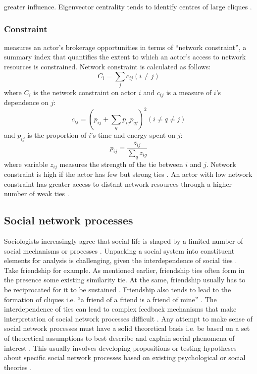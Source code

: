 greater influence. Eigenvector centrality tends to identify centres of large cliques \citep{borgatti2013analyzing}. \medskip

\subsubsection{Constraint}

\citet{burt1992structural} measures an actor's brokerage opportunities in terms of \enquote{network constraint}, a summary index that quantifies the extent to which an actor's access to network resources is constrained. Network constraint is calculated as follows: $$ C_i = \sum_j c_{ij} (i \neq j) $$ where $C_i$ is the network constraint on actor $i$ and $c_{ij}$ is a measure of $i$'s dependence on $j$: $$ c_{ij} = (p_{ij} + \sum_qp_{iq}p_{qj})^2 (i \neq q \ne j) $$ and $p_{ij}$ is the proportion of $i$'s time and energy spent on $j$: $$ p_{ij} = \frac{z_{ij}}{\sum_qz_{ig}} $$ where variable $z_{ij}$ measures the strength of the tie between $i$ and $j$. Network constraint is high if the actor has few but strong ties \citep{burt2010neighbor}. An actor with low network constraint has greater access to distant network resources through a higher number of weak ties \citep{granovetter1973strength}. \medskip

\subsection{Social network processes}

Sociologists increasingly agree that social life is shaped by a limited number of social mechanisms or processes \citep{crossley2015cases}. Unpacking a social system into constituent elements for analysis is challenging, given the interdependence of social ties \citep{robins2015doing}. Take friendship for example. As mentioned earlier, friendship ties often form in the presence some existing similarity tie. At the same, friendship usually has to be reciprocated for it to be sustained \citep{hartup1996company,almaatouq2016role}. Friendship also tends to lead to the formation of cliques i.e. \enquote{a friend of a friend is a friend of mine} \citep{lusher2013exponential}. The interdependence of ties can lead to complex feedback mechanisms that make interpretation of social network processes difficult \citep{robins2015doing}. Any attempt to make sense of social network processes must have a solid theoretical basis i.e. be based on a set of theoretical assumptions to best describe and explain social phenomena of interest \citep{borgatti2013analyzing}. This usually involves developing propositions or testing hypotheses about specific social network processes based on existing psychological or social theories \citep{scott2017social}. \medskip

